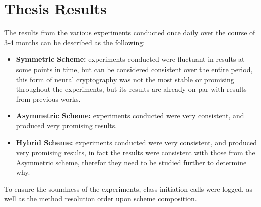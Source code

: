 \documentclass[a4paper, 12pt]{report}
\begin{document}
\section{\textbf{Thesis Results}}
The results from the various experiments conducted once daily over the course of 3-4 months can be described as the following:
\begin{itemize}
	\item \textbf{Symmetric Scheme:} experiments conducted were fluctuant in results at some points in time, but can be considered consistent over the entire period, this form of neural cryptography was not the most stable or promising throughout the experiments, but its results are already on par with results from previous works.
	\item \textbf{Asymmetric Scheme:} experiments conducted were very consistent, and produced very promising results.
	\item \textbf{Hybrid Scheme:} experiments conducted were very consistent, and produced very promising results, in fact the results were consistent with those from the Asymmetric scheme, therefor they need to be studied further to determine why.
\end{itemize}
To ensure the soundness of the experiments, class initiation calls were logged, as well as the method resolution order upon scheme composition.
\end{document}
